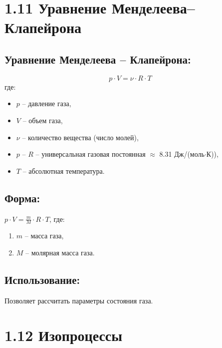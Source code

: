 \documentclass[a4paper,12pt]{article}
\begin{document}
\section*{1.11 Уравнение Менделеева–Клапейрона}

\vspace{-9pt}
\subsection*{Уравнение Менделеева – Клапейрона:}
\vspace{-3pt}
$$p \cdot V = \nu \cdot R \cdot T$$ 
где:
\begin{itemize}
    \item $p$ – давление газа,
    \item $V$ – объем газа,
    \item $\nu$ – количество вещества (число молей),
    \item $p$ – $R$ – универсальная газовая постоянная $\approx$ 8.31 Дж/(моль$\cdot$К)),
    \item $T$ – абсолютная температура.
\end{itemize}

\vspace{-9pt}
\subsection*{Форма:}
\vspace{-3pt}
$p \cdot V = \frac{m}{M}\cdot R\cdot T$, 
где: 
\begin{enumerate}
    \item $m$ – масса газа,
    \item $M$ – молярная масса газа.
\end{enumerate}

\vspace{-9pt}
\subsection*{Использование:}
\vspace{-3pt}
Позволяет рассчитать параметры состояния газа.



\section*{1.12 Изопроцессы}

\vspace{-9pt}
\end{document}
